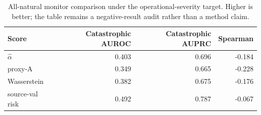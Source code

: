 \begin{table}[htbp]
\centering
\scriptsize
\setlength{\tabcolsep}{4pt}
\caption{All-natural monitor comparison under the operational-severity target. Higher is better; the table remains a negative-result audit rather than a method claim.}
\label{tab:acsac-monitor}
\begin{tabular}{lrrr}
\toprule
Score & Catastrophic AUROC & Catastrophic AUPRC & Spearman \\
\midrule
$\hat{\alpha}$ & 0.403 & 0.696 & -0.184 \\
proxy-A & 0.349 & 0.665 & -0.228 \\
Wasserstein & 0.382 & 0.675 & -0.176 \\
source-val risk & 0.492 & 0.787 & -0.067 \\
\bottomrule
\end{tabular}
\end{table}
